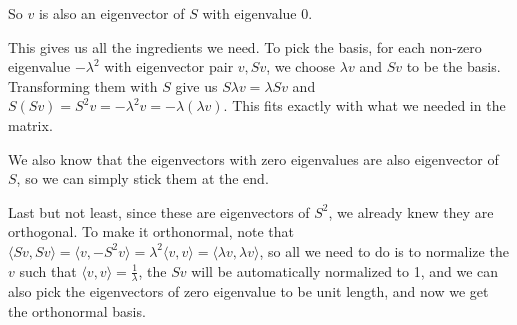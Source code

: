 So $ v $ is also an eigenvector of $ S $ with eigenvalue 0.

This gives us all the ingredients we need. To pick the basis, for each non-zero eigenvalue $ -\lambda^2 $ with eigenvector pair $ v, Sv $, we choose $ \lambda v $ and $ Sv $ to be the basis. Transforming them with $ S $ give us $ S \lambda v = \lambda Sv $ and $ S(Sv) = S^2 v = -\lambda^2 v = -\lambda (\lambda v) $. This fits exactly with what we needed in the matrix.

We also know that the eigenvectors with zero eigenvalues are also eigenvector of $ S $, so we can simply stick them at the end.

Last but not least, since these are eigenvectors of $ S^2 $, we already knew they are orthogonal. To make it orthonormal, note that $ \langle Sv, Sv \rangle = \langle v, -S^2v \rangle = \lambda^2 \langle v, v \rangle = \langle \lambda v, \lambda v \rangle $, so all we need to do is to normalize the $ v $ such that $ \langle v, v \rangle = \frac{1}{\lambda} $, the $ Sv $ will be automatically normalized to 1, and we can also pick the eigenvectors of zero eigenvalue to be unit length, and now we get the orthonormal basis.
